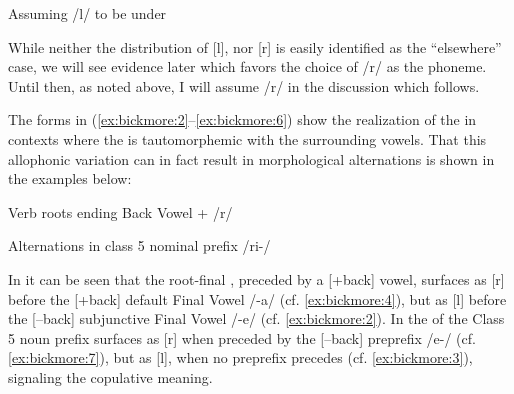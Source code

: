 \documentclass[output=paper,modfonts,nonflat,
colorlinks, citecolor=brown,
draftmode,
]{langsci/langscibook}
\begin{document}
\ea\label{ex:bickmore:9}
  Assuming /l/ to be under \\
 
\z


 

While neither the distribution of [l], nor [r] is easily identified as the “elsewhere” case, we will see evidence later which favors the choice of /r/ as the phoneme. Until then, as noted above, I will assume /r/ in the discussion which follows. 

The forms in (\ref{ex:bickmore:2}--\ref{ex:bickmore:6}) show the realization of the  in contexts where the  is tautomorphemic with the surrounding vowels. That this allophonic variation can in fact result in morphological alternations is shown in the examples below:

\newpage 
\ea\label{ex:bickmore:10}
Verb roots ending Back Vowel + /r/ 
\ea\label{ex:bickmore:10a}
%
%
\ex\label{ex:bickmore:10b}
\ex\label{ex:bickmore:10c}
\ex\label{ex:bickmore:10d}
\ex\label{ex:bickmore:10e}
\ex\label{ex:bickmore:10f}
\z
\z

\ea\label{ex:bickmore:11}
Alternations in class 5 nominal prefix /ri-/ 
\ea\label{ex:bickmore:11a}
\ex\label{ex:bickmore:11b}
\ex\label{ex:bickmore:11c}
\ex\label{ex:bickmore:11d}
\ex\label{ex:bickmore:11e}
\ex\label{ex:bickmore:11f}
\z
\z

In  it can be seen that the root-final , preceded by a [+back] vowel, surfaces as [r] before the [+back] default Final Vowel /-a/ (cf. \ref{ex:bickmore:4}), but as [l] before the [--back] subjunctive Final Vowel /-e/ (cf. \ref{ex:bickmore:2}). In  the  of the Class 5 noun prefix surfaces as [r] when preceded by the [--back] preprefix /e-/ (cf. \ref{ex:bickmore:7}), but as [l], when no preprefix precedes (cf. \ref{ex:bickmore:3}), signaling the copulative meaning. 
\end{document}
